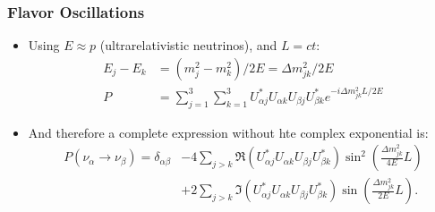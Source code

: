 \documentclass[mathserif,18pt,xcolor=table]{beamer}
\begin{document}
\begin{frame}
  \frametitle{Flavor Oscillations}
  \begin{itemize}
  \item Using $E\approx p$ (ultrarelativistic neutrinos), and $L = ct$:
    \begin{align}
      E_j - E_k &= \left(m_j^2 - m_k^2\right)/2E = \Delta m_{jk}^2/2E \\
      P &= \sum_{j=1}^3\sum_{k=1}^3 U^*_{\alpha j}U_{\alpha k}U_{\beta j}U_{\beta k}^* e^{-i\Delta m_{jk}^2L/2E}
    \end{align}
  \item And therefore a complete expression without hte complex exponential is:
    \begin{align}
        P(\nu_{\alpha}\rightarrow\nu_{\beta}) = \delta_{\alpha\beta} & - 4\sum_{j>k}\Re\left(U_{\alpha j}^*U_{\alpha k}U_{\beta j}U_{\beta k}^*\right)\sin^2\left(\frac{\Delta m_{jk}^2}{4E}L\right) \nonumber \\
  & + 2\sum_{j>k}\Im\left(U_{\alpha j}^*U_{\alpha k}U_{\beta j}U_{\beta k}^*\right)\sin\left(\frac{\Delta m_{jk}^2}{2E}L\right).
    \end{align}
  \end{itemize}
\end{frame}
\end{document}
